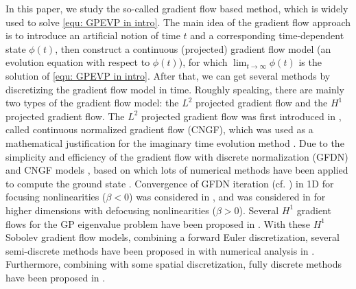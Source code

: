 \documentclass{siamart250211}
\begin{document}
In this paper, we study the so-called gradient flow based method, which is widely used to solve \eqref{equ: GPEVP in intro}. The main idea of the gradient flow approach is to introduce an artificial notion of time $t$ and a corresponding time-dependent state $\phi(t)$, then construct a continuous (projected) gradient flow model (an evolution equation with respect to $\phi(t)$), for which $\lim_{t\to\infty}\phi(t)$ is the solution of \eqref{equ: GPEVP in intro}. After that, we can get several methods by discretizing the gradient flow model in time. Roughly speaking, there are mainly two types of the gradient flow model: the $L^2$ projected gradient flow and the $H^1$ projected gradient flow. The $L^2$ projected gradient flow was first introduced in \cite{bao2004computing}, called continuous normalized gradient flow (CNGF), which was used as a mathematical justification for 
the imaginary time evolution method \cite{aftalion2001vortices,cerimele2000numerical,chiofalo2000ground}. Due to the simplicity and efficiency of the gradient flow with discrete normalization (GFDN) and CNGF models \cite{bao2004computing}, based on which lots of numerical methods have been applied to compute the ground state \cite{bao2013mathematical,bao2006efficient,bao2004computing,bao2007mass,liu2021normalized,wang2014projection,zhuang2019efficient}. Convergence of GFDN iteration (cf. \cite[Definition 4.1]{henning2023dependency}) in 1D for focusing nonlinearities ($\beta < 0$) was considered in \cite{faou2018convergence}, and was considered in \cite{henning2023dependency} for higher dimensions with defocusing nonlinearities ($\beta > 0$). Several $H^1$ gradient flows for the GP eigenvalue problem have been proposed in \cite{danaila2010new,henning2020sobolev,  kazemi2010minimizing}. With these $H^1$ Sobolev gradient flow models, combining a forward Euler discretization, several semi-discrete methods have been proposed in \cite{danaila2010new,henning2020sobolev,  kazemi2010minimizing} with numerical analysis in \cite{chen2024convergence,henning2023dependency,henning2020sobolev,zhang2022exponential}. Furthermore, combining with some spatial discretization, fully discrete methods have been proposed in \cite{chen2024fullydiscretizedsobolevgradient,heid2021gradient}. 
\end{document}
